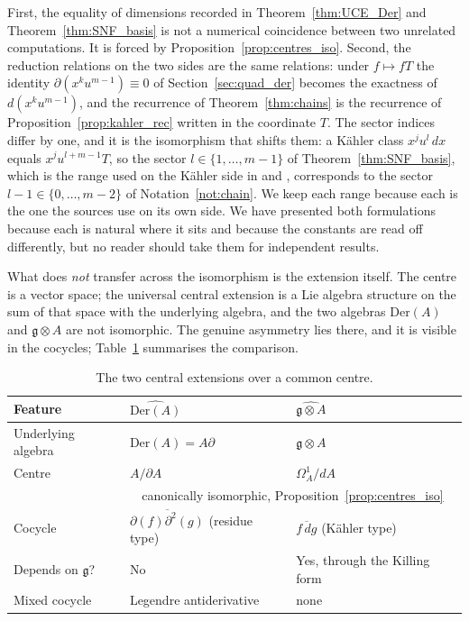\documentclass[11pt]{amsart}
\theoremstyle{definition}
\theoremstyle{remark}
\newcommand{\g}{\mathfrak{g}}
\newcommand{\Der}{\mathrm{Der}}
\newcommand{\pa}{\partial}
\newcommand{\hDer}{\widehat{\Der(A)}}
\newcommand{\hg}{\widehat{\g\otimes A}}
\newcommand{\ol}[1]{\overline{#1}}
\begin{document}
First, the equality of dimensions recorded in Theorem~\ref{thm:UCE_Der} and
Theorem~\ref{thm:SNF_basis} is not a numerical coincidence between two
unrelated computations. It is forced by Proposition~\ref{prop:centres_iso}.
Second, the reduction relations on the two sides are the same relations: under
$f\mapsto fT$ the identity $\pa(x^ku^{m-1})\equiv0$ of
Section~\ref{sec:quad_der} becomes the exactness of $d(x^ku^{m-1})$, and the
recurrence of Theorem~\ref{thm:chains} is the recurrence of
Proposition~\ref{prop:kahler_rec} written in the coordinate $T$. The sector
indices differ by one, and it is the isomorphism that shifts them: a K\"ahler
class $x^{j}u^{l}\,dx$ equals $x^{j}u^{l+m-1}T$, so the sector
$l\in\{1,\dots,m-1\}$ of Theorem~\ref{thm:SNF_basis}, which is the range used on
the K\"ahler side in \cite{Santos2022} and \cite{SantosNeklyudovFutorny2025},
corresponds to the sector $l-1\in\{0,\dots,m-2\}$ of Notation~\ref{not:chain}.
We keep each range because each is the one the sources use on its own side. We
have presented both formulations because each is natural where it sits and
because the constants are read off differently, but no reader should take them
for independent results.

What does \emph{not} transfer across the isomorphism is the extension itself.
The centre is a vector space; the universal central extension is a Lie algebra
structure on the sum of that space with the underlying algebra, and the two
algebras $\Der(A)$ and $\g\otimes A$ are not isomorphic. The genuine asymmetry
lies there, and it is visible in the cocycles;
Table~\ref{tab:comparison} summarises the comparison.

\begin{table}[ht]
\centering
\caption{The two central extensions over a common centre.}
\label{tab:comparison}
\small
\begin{tabular}{@{}lll@{}}
\toprule
\textbf{Feature} & $\hDer$ & $\hg$ \\
\midrule
Underlying algebra & $\Der(A)=A\pa$ & $\g\otimes A$ \\
Centre & $A/\pa A$ & $\Omega^1_A/dA$ \\
 & \multicolumn{2}{c}{canonically isomorphic, Proposition~\ref{prop:centres_iso}} \\
Cocycle & $\ol{\pa(f)\pa^2(g)}$ (residue type) &
  $\ol{f\,dg}$ (K\"ahler type) \\
Depends on $\g$? & No & Yes, through the Killing form \\
Mixed cocycle & Legendre antiderivative & none \\
\bottomrule
\end{tabular}
\end{table}
\end{document}
